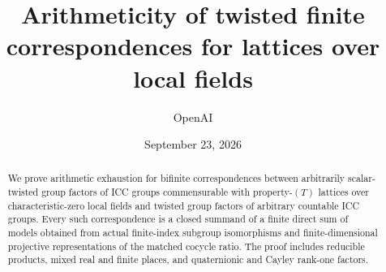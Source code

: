 \documentclass[11pt,a4paper]{amsart}
\title[Arithmeticity of twisted finite correspondences]{Arithmeticity of twisted finite correspondences for lattices over local fields}
\author{OpenAI}
\date{September 23, 2026}
\numberwithin{equation}{section}
\theoremstyle{plain}
\theoremstyle{definition}
\theoremstyle{remark}
\begin{document}
\begin{abstract}
We prove arithmetic exhaustion for bifinite correspondences between
arbitrarily scalar-twisted group factors of ICC groups commensurable with
property-$(T)$ lattices over characteristic-zero local fields and twisted
group factors of arbitrary countable ICC groups. Every such correspondence
is a closed summand of a finite direct sum of models obtained from actual
finite-index subgroup isomorphisms and finite-dimensional projective
representations of the matched cocycle ratio. The proof includes reducible
products, mixed real and finite places, and quaternionic and Cayley
rank-one factors.
\end{abstract}
\maketitle
\begingroup
\setlength{\baselineskip}{0.94\baselineskip}
\tableofcontents
\endgroup


\FloatBarrier













\clearpage


\end{document}
